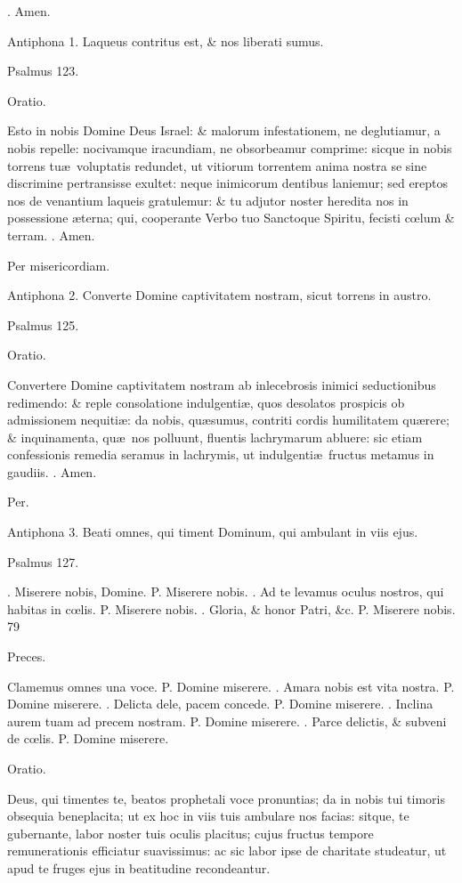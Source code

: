 \documentclass[letter,11pt]{book}
\makeatletter
\DeclareRobustCommand{\Vbar}{\vers@resp{-0.1em}{V}}
\DeclareRobustCommand{\Rbar}{\vers@resp{0pt}{R}}
\newcommand{\vers@resp@sym}{\raisebox{0.2ex}{\rotatebox[origin=c]{-20}{$\m@th\rceil$}}}
\newcommand{\vers@resp}[2]{%
  {\ooalign{\hidewidth\kern#1\vers@resp@sym\hidewidth\cr#2\cr}}%
}%
\def\P{\color{Red} P. \color{black}}
\def\V{\color{Red} \Vbar . \color{black}}
\def\R{\color{Red} \Rbar . \color{black}}
\makeatother
\begin{document}
\begin{multicols*}{2}
\R Amen.

Antiphona 1. Laqueus contritus est, \& nos liberati sumus.

Psalmus 123.

Oratio.

Esto in nobis Domine Deus Israel: \& malorum infestationem, ne deglutiamur, a nobis repelle: nocivamque iracundiam, ne obsorbeamur comprime: sicque in nobis torrens tu\ae \ voluptatis redundet, ut vitiorum torrentem anima nostra se sine discrimine pertransisse exultet: neque inimicorum dentibus laniemur; sed ereptos nos de venantium laqueis gratulemur: \& tu adjutor noster heredita nos in possessione \ae terna; qui, cooperante Verbo tuo Sanctoque Spiritu, fecisti c\oe lum \& terram.
\R Amen.

Per misericordiam.

Antiphona 2. Converte Domine captivitatem nostram, sicut torrens in austro.

Psalmus 125.

Oratio.

Convertere Domine captivitatem nostram ab inlecebrosis inimici seductionibus redimendo: \& reple consolatione indulgenti\ae , quos desolatos prospicis ob admissionem nequiti\ae : da nobis, qu\ae sumus, contriti cordis humilitatem qu\ae rere; \& inquinamenta, qu\ae \ nos polluunt, fluentis lachrymarum abluere: sic etiam confessionis remedia seramus in lachrymis, ut indulgenti\ae \ fructus metamus in gaudiis.
\R Amen.

Per.

Antiphona 3. Beati omnes, qui timent Dominum, qui ambulant in viis ejus.

Psalmus 127.

\R Miserere nobis, Domine. \P Miserere nobis. \V Ad te levamus oculus nostros, qui habitas in c\oe lis. \P Miserere nobis. \V Gloria, \& honor Patri, \&c. \P Miserere nobis. 79

Preces.

Clamemus omnes una voce. \P Domine miserere. \V Amara nobis est vita nostra. \P Domine miserere. \V Delicta dele, pacem concede. \P Domine miserere. \V Inclina aurem tuam ad precem nostram. \P Domine miserere. \V Parce delictis, \& subveni de c\oe lis. \P Domine miserere.

Oratio.

Deus, qui timentes te, beatos prophetali voce pronuntias; da in nobis tui timoris obsequia beneplacita; ut ex hoc in viis tuis ambulare nos facias: sitque, te gubernante, labor noster tuis oculis placitus; cujus fructus tempore remunerationis efficiatur suavissimus: ac sic labor ipse de charitate studeatur, ut apud te fruges ejus in beatitudine recondeantur.


\end{multicols*}
\end{document}
